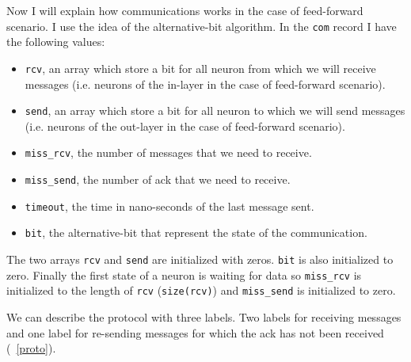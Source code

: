 \documentclass[12pt]{article}
\begin{document}
Now I will explain how communications works in the case of feed-forward scenario. I use the idea of the alternative-bit algorithm. In the \verb|com| record I have the following values:
\begin{itemize}
	\item \verb|rcv|, an array which store a bit for all neuron from which we will receive messages (i.e. neurons of the in-layer in the case of feed-forward scenario).
	\item \verb|send|, an array which store a bit for all neuron to which we will send messages (i.e. neurons of the out-layer in the case of feed-forward scenario).
	\item \verb|miss_rcv|, the number of messages that we need to receive.
	\item \verb|miss_send|, the number of ack that we need to receive.
	\item \verb|timeout|, the time in nano-seconds of the last message sent.
	\item \verb|bit|, the alternative-bit that represent the state of the communication.
\end{itemize}
The two arrays \verb|rcv| and \verb|send| are initialized with zeros. \verb|bit| is also initialized to zero. Finally the first state of a neuron is waiting for data so \verb|miss_rcv| is initialized to the length of \verb|rcv| (\verb|size(rcv)|) and \verb|miss_send| is initialized to zero.

We can describe the protocol with three labels. Two labels for receiving messages and one label for re-sending messages for which the ack has not been received (\figurename~\ref{proto}).
\end{document}
